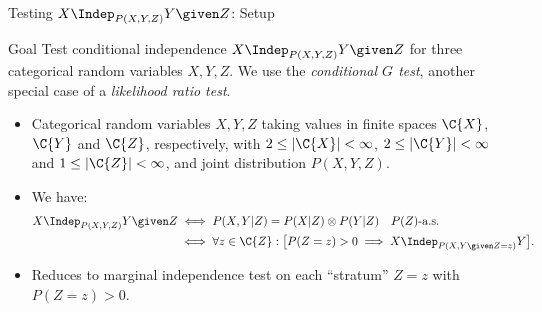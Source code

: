 \begin{frame}{Testing $X \Indep_{P(X,Y,Z)} Y \given Z$: Setup}
  \begin{block}{Goal}
    Test conditional independence $X \Indep_{P(X,Y,Z)} Y \given Z$ for three categorical random variables $X,Y,Z$.
    We use the \emph{conditional $G$ test}, another special case of a \emph{likelihood ratio test}.
  \end{block}
  \begin{itemize}
    \item Categorical random variables $X,Y,Z$ taking values in finite spaces $\C{X}$, $\C{Y}$
and $\C{Z}$, respectively, with $2 \le |\C{X}| < \infty$, $2 \le |\C{Y}| < \infty$ and $1 \le |\C{Z}| < \infty$, and joint distribution $P(X,Y,Z)$.
    \item We have:
      \begin{equation*}\begin{split}
        X \Indep_{P(X,Y,Z)} Y \given Z 
        & \iff P(X,Y | Z) = P(X | Z) \otimes P(Y | Z) \quad \text{$P(Z)$-a.s.} \\
        & \iff \forall z \in \C{Z}: \big[P(Z=z) > 0 \implies X \Indep_{P(X,Y \given Z=z)} Y \big].
      \end{split}\end{equation*}
    \item Reduces to marginal independence test on each ``stratum'' $Z=z$ with $P(Z=z) > 0$.
  \end{itemize}
\end{frame}

